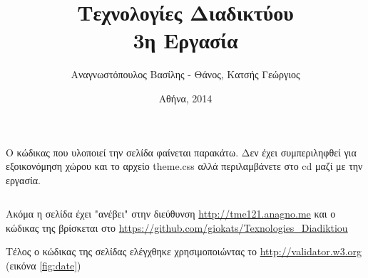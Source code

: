 \documentclass{assignment}
\title{Τεχνολογίες Διαδικτύου \\ 3η Εργασία}
\date{Αθήνα, 2014}
\author{Αναγνωστόπουλος Βασίλης - Θάνος, Κατσής Γεώργιος}
\begin{document}
\maketitle

\setcounter{page}{1} 

\pagestyle{plain}
\tableofcontents
\newpage


\pagestyle{fancy}
\setcounter{page}{1} 

\begin{Assignment}%

Ο κώδικας που υλοποιεί την σελίδα φαίνεται παρακάτω. Δεν έχει συμπεριληφθεί για εξοικονόμηση χώρου και το αρχείο theme.css αλλά περιλαμβάνετε στο cd μαζί με την εργασία.

\inputminted[linenos,tabsize=2]{html}{../../index.html}


Ακόμα η σελίδα έχει "ανέβει" στην διεύθυνση \url{http://tme121.anagno.me}
και ο κώδικας της βρίσκεται στο \url{https://github.com/giokats/Texnologies_Diadiktiou}
\end{Assignment}

Τέλος ο κώδικας της σελίδας ελέγχθηκε χρησιμοποιώντας το \url{http://validator.w3.org} (εικόνα 
\ref{fig:date})
\end{document}
